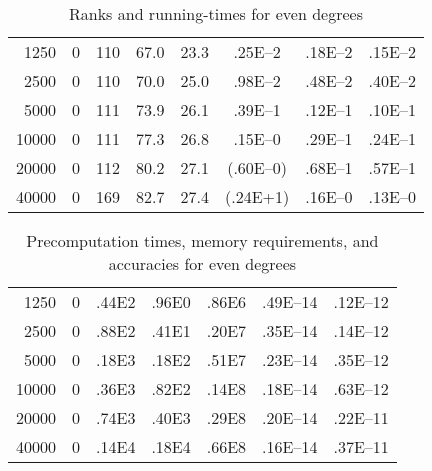 \documentclass[final,3p,times]{elsarticle}
\begin{document}
\begin{table}[p]
\caption{Ranks and running-times for even degrees}
\label{small_time}
\vspace{1em}
\begin{tabular*}{\columnwidth}{@{\extracolsep{\fill}}rrcccccc}
 &    &  &  &  &  &  &  \\\hline
 1250 &     0 &           110 &          67.0 &         23.3 &       .25E--2 &       .18E--2 &       .15E--2 \\\hline
 2500 &     0 &           110 &          70.0 &         25.0 &       .98E--2 &       .48E--2 &       .40E--2 \\\hline
 5000 &     0 &           111 &          73.9 &         26.1 &       .39E--1 &       .12E--1 &       .10E--1 \\\hline
10000 &     0 &           111 &          77.3 &         26.8 &       .15E--0 &       .29E--1 &       .24E--1 \\\hline
20000 &     0 &           112 &          80.2 &         27.1 &      (.60E--0)&       .68E--1 &       .57E--1 \\\hline
40000 &     0 &           169 &          82.7 &         27.4 &       (.24E+1)&       .16E--0 &       .13E--0 \\\hline
\end{tabular*}
\end{table}


\begin{table}[p]
\caption{Precomputation times, memory requirements, and accuracies
         for even degrees}
\label{small_pre}
\vspace{1em}
\begin{tabular*}{\columnwidth}{@{\extracolsep{\fill}}rrccccc}
 &    &  &  &  &  &  \\\hline
 1250 &     0 &          .44E2 &          .96E0 &         .86E6 &             .49E--14 &             .12E--12 \\\hline
 2500 &     0 &          .88E2 &          .41E1 &         .20E7 &             .35E--14 &             .14E--12 \\\hline
 5000 &     0 &          .18E3 &          .18E2 &         .51E7 &             .23E--14 &             .35E--12 \\\hline
10000 &     0 &          .36E3 &          .82E2 &         .14E8 &             .18E--14 &             .63E--12 \\\hline
20000 &     0 &          .74E3 &          .40E3 &         .29E8 &             .20E--14 &             .22E--11 \\\hline
40000 &     0 &          .14E4 &          .18E4 &         .66E8 &             .16E--14 &             .37E--11 \\\hline
\end{tabular*}
\end{table}
\end{document}
